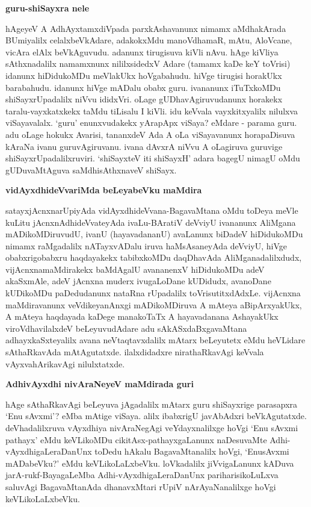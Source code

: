 {\bigskip
\noindent
{\large\bf guru-shiSayxra nele}}\label{page66}
\medskip

\noindent
hAgeyeV A AdhAyxtamxdiVpada parxkAshavanunx nimamx aMdhakArada BUmiyalilx celalxbeVkAdare, adakokxM\-du manoVdhamaR, mAtu, AloVcane, vicAra elAlx beVkAguvudu. adanunx tirugisuva kiVli nAvu. hAge kiVliya sAthxnadalilx namamxnunx nililxsidedxV Adare (tamamx kaDe keY toVrisi) idanunx hiDidukoMDu meVlakUkx hoVgabahudu. hiVge tirugisi horakUkx barabahudu. idanunx hiVge mADalu obabx guru. iva\-nanunx iTuTxkoMDu shiSayxrUpadalilx niVvu ididxVri. oLage gUDhavAgiruvudanunx horakekx taralu-vayxkatxkekx taMdu tiLisalu I kiVli. idu keVvala vayxkitxyalilx nilulxva viSayavalalx. `guru' enunxvudakekx yArapApx viSaya? eMdare - parama guru. adu oLage hokukx Avarisi, tananxdeV Ada A oLa viSayavanunx hora\-paDi\-suva kAraNa ivanu guruvAgiruvanu. ivana dAvxrA niVvu A oLagiruva guruvige shiSayxrUpada\-lilxru\-viri. `shiSayxteV iti shiSayxH' adara bagegU nimagU oMdu gUDuvaMtAguva saMdhisAthxnaveV shiSayx.

{\bigskip
\noindent
{\large\bf vidAyxdhideVvariMda beLeyabeVku maMdira}}
\medskip

\noindent
satayxjAcnxnarUpiyAda vidAyxdhideVvana-BagavaMtana oMdu toDeya meVle kuLitu jAcnxnAdhideVvate\-yAda ivaLu-BAratiV deVviyU ivananunx AliMgana mADi\break\-koMDiruvudU, ivanU (hayavada\-nanU) ava\-Lanunx biDadeV hiDidukoMDu \hbox{nimamx} raMgadalilx nATayxvADalu iruva haMsAsaneyAda deVvi\-yU, hiVge obabxri\-gobabxru haqdayakekx tabibxkoMDu daqDhavAda AliMganadalilxdudx, vijAcnxnamaMdirakekx baMdA\-galU ava\-nanenxV hiDidukoMDu adeV akaSxmAle, adeV jAcnxna muderx ivugaLoDane kUDidudx, avano\-Dane kUDi\-koMDu paDedudanunx nataRna rUpadalilx toVrisutitxdAdxLe. vijAcnxna maMdiravanunx veVdikeya\-nAnxgi mADi\-koMDiruva A mAteya aBipArxyakUkx, A mAteya haqdayada kaDege manakoTaTx A hayavadanana AshayakUkx viroVdhavilalxdeV beLeyuvudAdare adu sAkASxdaBxgavaMtana adhayxkaSxteyalilx avana neVtaqtavxdalilx mAtarx beLeyutetx eMdu heVLidare sAthaRkavAda mAtAgutatxde. ilalxdidadxre nirathaRkavAgi keVvala vAyxva\-hArikavAgi nilulxtatxde.

{\bigskip
\noindent
{\large\bf AdhivAyxdhi nivAraNeyeV maMdirada guri}}\label{page67}
\medskip

\noindent
hAge sAthaRkavAgi beLeyuva jAgadalilx mAtarx guru shiSayxrige parasapxra `Enu sAvxmi'? eMba mAtige viSaya. alilx ibabxrigU javAbAdxri beVkAgutatxde. deVhadalilxruva vAyxdhiya nivAraNegAgi veYdayxnalilxge hoVgi `Enu sAvxmi pathayx' eMdu keVLikoMDu cikitAsx-pathayxgaLanunx naDesuvaMte Adhi-vAyxdhigaLeraDanUnx toDedu hAkalu BagavaMtanalilx hoVgi, `EnusAvxmi mADabeVku?' eMdu keVLikoLaLxbeVku. loVkadalilx jiVvigaLanunx kADuva jarA-rukf-BayagaLeMba Adhi-vAyxdhigaLeraDanUnx pariharisikoLuLxva saluvAgi Baga\-vaMtanAda dhanavxMtari rUpiV nArAyaNanalilxge hoVgi keVLikoLaLxbeVku.

